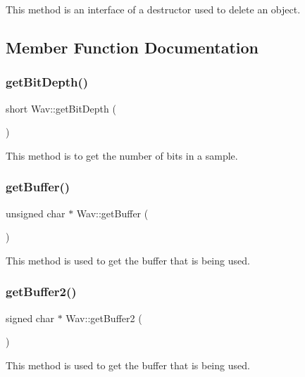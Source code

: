 This method is an interface of a destructor used to delete an object. 

\subsection{Member Function Documentation}
\mbox{\label{classWav_a7620ba9a7653b718ac96f11ff4e453f3}} 
\subsubsection{\texorpdfstring{get\+Bit\+Depth()}{getBitDepth()}}
{\footnotesize\ttfamily short Wav\+::get\+Bit\+Depth (\begin{DoxyParamCaption}{ }\end{DoxyParamCaption})}

This method is to get the number of bits in a sample. \mbox{\label{classWav_a2daf07a90ed34789e3a1874973d9bd36}} 
\subsubsection{\texorpdfstring{get\+Buffer()}{getBuffer()}}
{\footnotesize\ttfamily unsigned char $\ast$ Wav\+::get\+Buffer (\begin{DoxyParamCaption}{ }\end{DoxyParamCaption})}

This method is used to get the buffer that is being used. \mbox{\label{classWav_acfc2d513023f780f716bf3ed35a7ec44}} 
\subsubsection{\texorpdfstring{get\+Buffer2()}{getBuffer2()}}
{\footnotesize\ttfamily signed char $\ast$ Wav\+::get\+Buffer2 (\begin{DoxyParamCaption}{ }\end{DoxyParamCaption})}

This method is used to get the buffer that is being used. \mbox{\label{classWav_a11de10cb698ea0ea08f3a28580f21b39}} 
